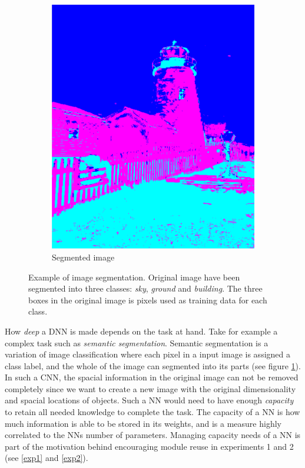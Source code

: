 \begin{figure}
    \begin{subfigure}[h]{0.49\linewidth}
        \includegraphics[width=\linewidth]{Chapters/Background/figures/segmentation.png}
        \caption{Segmented image}
    \end{subfigure}
    \caption{Example of image segmentation. Original image have been segmented into three classes: \textit{sky}, \textit{ground} and \textit{building}. The three boxes in the original image is pixels used as training data for each class.}
    \label{fig:semanticsegmentation}
\end{figure}

How \textit{deep} a DNN is made depends on the task at hand. Take for example a complex task such as \textit{semantic segmentation}. Semantic segmentation is a variation of image classification where each pixel in a input image is assigned a class label, and the whole of the image can segmented into its parts (see figure \ref{fig:semanticsegmentation}). In such a CNN, the spacial information in the original image can not be removed completely since we want to create a new image with the original dimensionality and spacial locations of objects. Such a NN would need to have enough \textit{capacity} to retain all needed knowledge to complete the task. The capacity of a NN is how much information is able to be stored in its weights, and is a measure highly correlated to the NNs number of parameters. Managing capacity needs of a NN is part of the motivation behind encouraging module reuse in experiments 1 and 2 (see \ref{exp1} and \ref{exp2}).

